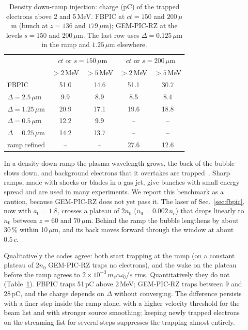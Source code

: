 \documentclass[aps,prab,reprint,floatfix,superscriptaddress,amsmath,amssymb]{revtex4-2}
\begin{document}
\begin{table}[htb]
\caption{Density down-ramp injection: charge (pC) of the trapped electrons above 2 and 5\,MeV. FBPIC at $ct = 150$ and $200\,\mu$m (bunch at $z = 136$ and $179\,\mu$m); GEM-PIC-RZ at the levels $s = 150$ and $200\,\mu$m. The last row uses $\Delta = 0.125\,\mu$m in the ramp and $1.25\,\mu$m elsewhere.}\label{tab:downramp}
\begin{ruledtabular}
\begin{tabular}{lcccc}
 & \multicolumn{2}{c}{$ct$ or $s = 150\,\mu$m} & \multicolumn{2}{c}{$ct$ or $s = 200\,\mu$m} \\
 & $>2$\,MeV & $>5$\,MeV & $>2$\,MeV & $>5$\,MeV \\
\hline
FBPIC & 51.0 & 14.6 & 51.1 & 30.7 \\
$\Delta = 2.5\,\mu$m & 9.9 & 8.9 & 8.5 & 8.4 \\
$\Delta = 1.25\,\mu$m & 20.9 & 17.1 & 19.6 & 18.8 \\
$\Delta = 0.5\,\mu$m & 12.2 & 9.9 & -- & -- \\
$\Delta = 0.25\,\mu$m & 14.2 & 13.7 & -- & -- \\
ramp refined & -- & -- & 27.6 & 12.6 \\
\end{tabular}
\end{ruledtabular}
\end{table}

In a density down-ramp the plasma wavelength grows, the back of the bubble slows down, and background electrons that it overtakes are trapped~\cite{Bulanov1998,Geddes2008,Buck2013}. Sharp ramps, made with shocks or blades in a gas jet, give bunches with small energy spread and are used in many experiments. We report this benchmark as a caution, because GEM-PIC-RZ does not yet pass it. The laser of Sec.~\ref{sec:fbpic}, now with $a_0 = 1.8$, crosses a plateau of $2n_0$ ($n_0 = 0.002\,n_c$) that drops linearly to $n_0$ between $z = 60$ and $70\,\mu$m. Behind the ramp the bubble lengthens by about 30\,\% within 10\,$\mu$m, and its back moves forward through the window at about $0.5\,c$.

Qualitatively the codes agree: both start trapping at the ramp (on a constant plateau of $2n_0$ GEM-PIC-RZ traps no electrons), and the wake on the plateau before the ramp agrees to $2\times10^{-3}\,m_ec\omega_0/e$ rms. Quantitatively they do not (Table~\ref{tab:downramp}). FBPIC traps 51\,pC above 2\,MeV; GEM-PIC-RZ traps between 9 and 28\,pC, and the charge depends on $\Delta$ without converging. The difference persists with a finer step inside the ramp alone, with a higher velocity threshold for the beam list and with stronger source smoothing; keeping newly trapped electrons on the streaming list for several steps suppresses the trapping almost entirely.
\end{document}
